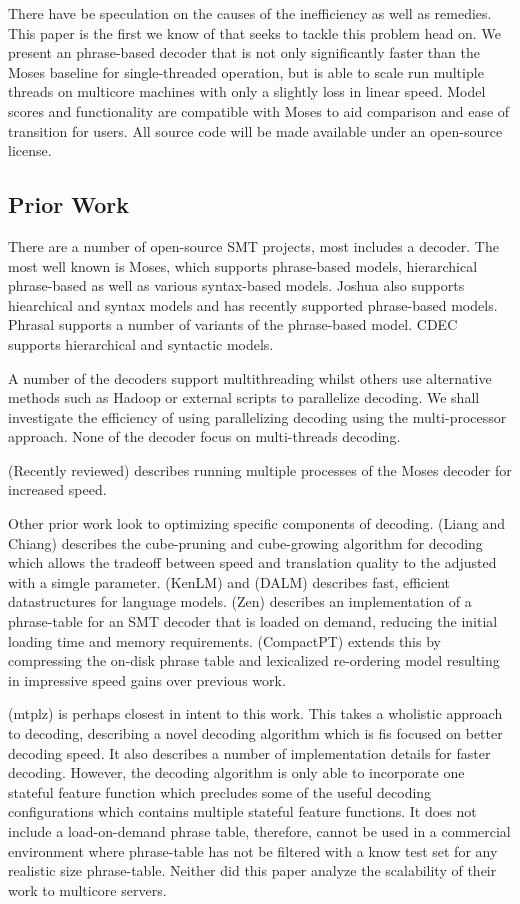 \documentclass[11pt]{article}
\begin{document}
There have be speculation on the causes of the inefficiency as well as remedies. This paper is the first we know of that seeks to tackle this problem head on. We present an phrase-based decoder that is not only significantly faster than the Moses baseline for single-threaded operation, but is able to scale run multiple threads on multicore machines with only a slightly loss in linear speed. Model scores and functionality are compatible with Moses to aid comparison and ease of transition for users. All source code will be made available under an open-source license.

\subsection{Prior Work}

There are a number of open-source SMT projects, most includes a decoder. The most well known is Moses, which supports phrase-based models, hierarchical phrase-based as well as various syntax-based models. Joshua also supports hiearchical and syntax models and has recently supported phrase-based models. Phrasal supports a number of variants of the phrase-based model. CDEC supports hierarchical and syntactic models.

A number of the decoders support multithreading whilst others use alternative methods such as Hadoop or external scripts to parallelize decoding. We shall investigate the efficiency of using parallelizing decoding using the multi-processor approach. None of the decoder focus on multi-threads decoding. 

(Recently reviewed) describes running multiple processes of the Moses decoder for increased speed.

Other prior work look to optimizing specific components of decoding. (Liang and Chiang) describes the cube-pruning and cube-growing algorithm for decoding which allows the tradeoff between speed and translation quality to the adjusted with a simgle parameter. (KenLM) and (DALM) describes fast, efficient datastructures for language models. (Zen) describes an implementation of a phrase-table for an SMT decoder that is loaded on demand, reducing the initial loading time and memory requirements. (CompactPT) extends this by compressing the on-disk phrase table and lexicalized re-ordering model resulting in impressive speed gains over previous work.

(mtplz) is perhaps closest in intent to this work. This takes a wholistic approach to decoding, describing a novel decoding algorithm which is fis focused on better decoding speed. It also describes a number of implementation details for faster decoding. However, the decoding algorithm is only able to incorporate one stateful feature function which precludes some of the useful decoding configurations which contains multiple stateful feature functions. It does not include a load-on-demand phrase table, therefore, cannot be used in a commercial environment where phrase-table has not be filtered with a know test set for any realistic size phrase-table. Neither did this paper analyze the scalability of their work to multicore servers.
\end{document}

